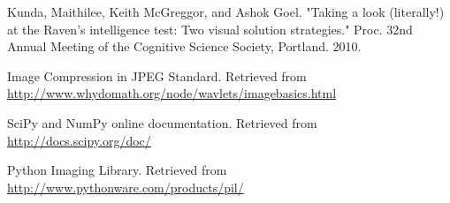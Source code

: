 \documentclass[10pt, letter]{article}
\begin{document}
\begin{thebibliography}{10}
 Kunda, Maithilee, Keith McGreggor, and Ashok Goel. "Taking a look (literally!) at the Raven’s intelligence test: Two visual solution strategies." Proc. 32nd Annual Meeting of the Cognitive Science Society, Portland. 2010.

 Image Compression in JPEG Standard. Retrieved from \url{http://www.whydomath.org/node/wavlets/imagebasics.html}

 SciPy and NumPy online documentation. Retrieved from \url{http://docs.scipy.org/doc/}

 Python Imaging Library. Retrieved from \url{http://www.pythonware.com/products/pil/}

\end{thebibliography}
\end{document}

